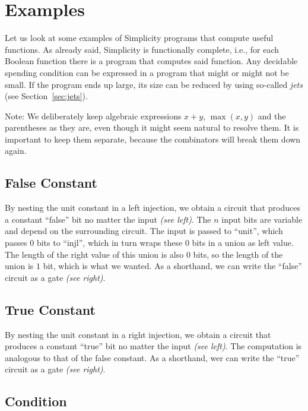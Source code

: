 \section{Examples}%
\label{sec:examples}

Let us look at some examples of Simplicity programs that compute useful functions.
As already said,
Simplicity is functionally complete,
i.e.,
for each Boolean function there is a program that computes said function.
Any decidable spending condition can be expressed in a program that might or might not be small.
If the program ends up large,
its size can be reduced by using so-called \emph{jets} (see Section~\ref{sec:jets}).

Note:
We deliberately keep algebraic expressions $x+y$, $\max(x,y)$ and the parentheses as they are,
even though it might seem natural to resolve them.
It is important to keep them separate,
because the combinators will break them down again.

\subsection{False Constant}


%
By nesting the unit constant in a left injection,
we obtain a circuit that produces a constant \enquote{false} bit no matter the input \emph{(see left)}.
The $n$ input bits are variable and depend on the surrounding circuit.
The input is passed to \enquote{unit},
which passes $0$ bits to \enquote{injl},
which in turn wraps these $0$ bits in a union as left value.
The length of the right value of this union is also $0$ bits,
so the length of the union is $1$ bit,
which is what we wanted.
%
As a shorthand,
we can write the \enquote{false} circuit as a gate \emph{(see right)}.

\subsection{True Constant}


%
By nesting the unit constant in a right injection,
we obtain a circuit that produces a constant \enquote{true} bit no matter the input \emph{(see left)}.
The computation is analogous to that of the false constant.
As a shorthand,
wer can write the \enquote{true} circuit as a gate \emph{(see right)}.

\subsection{Condition}

